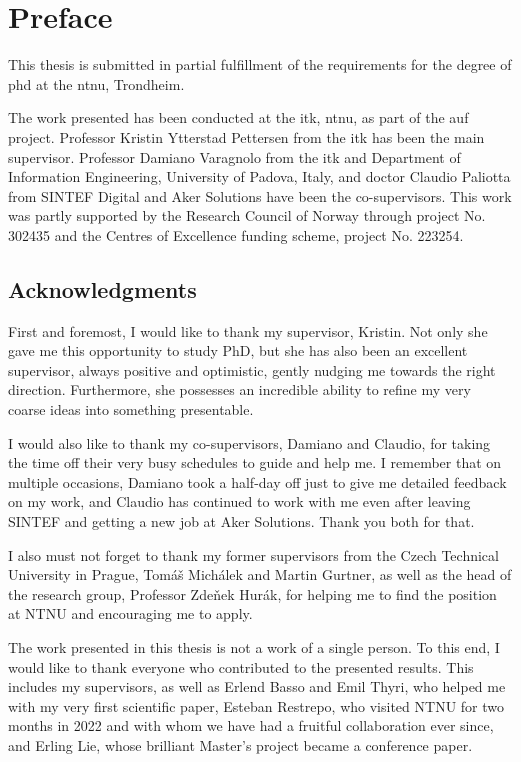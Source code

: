 \chapter*{Preface}

This thesis is submitted in partial fulfillment of the requirements for the degree of \gls{phd} at the \gls{ntnu}, Trondheim.

The work presented has been conducted at the \gls{itk}, \gls{ntnu}, as part of the \gls{auf} project.
Professor Kristin Ytterstad Pettersen from the \gls{itk} has been the main supervisor. 
Professor Damiano Varagnolo from the \gls{itk} and Department of Information Engineering, University of Padova, Italy, and doctor Claudio Paliotta from SINTEF Digital and Aker Solutions have been the co-supervisors.
This work was partly supported by the Research Council of Norway through project No. 302435 and the Centres of Excellence funding scheme, project No. 223254.

\section*{Acknowledgments}

First and foremost, I would like to thank my supervisor, Kristin.
Not only she gave me this opportunity to study PhD, but she has also been an excellent supervisor, always positive and optimistic, gently nudging me towards the right direction. 
Furthermore, she possesses an incredible ability to refine my very coarse ideas into something presentable.

I would also like to thank my co-supervisors, Damiano and Claudio, for taking the time off their very busy schedules to guide and help me.
I remember that on multiple occasions, Damiano took a half-day off just to give me detailed feedback on my work, and Claudio has continued to work with me even after leaving SINTEF and getting a new job at Aker Solutions.
Thank you both for that.

I also must not forget to thank my former supervisors from the Czech Technical University in Prague, Tomáš Michálek and Martin Gurtner, as well as the head of the research group, Professor Zdeňek Hurák, for helping me to find the position at NTNU and encouraging me to apply.

The work presented in this thesis is not a work of a single person.
To this end, I would like to thank everyone who contributed to the presented results.
This includes my supervisors, as well as Erlend Basso and Emil Thyri, who helped me with my very first scientific paper, Esteban Restrepo, who visited NTNU for two months in 2022 and with whom we have had a fruitful collaboration ever since, and Erling Lie, whose brilliant Master's project became a conference paper.

